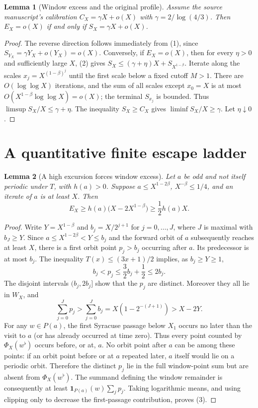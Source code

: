 \documentclass[11pt]{amsart}
\newtheorem{lemma}{Lemma}
\theoremstyle{remark}
\begin{document}
\begin{lemma}[Window excess and the original profile]\label{lem:equivalence}
Assume the source manuscript's calibration
$C_X=\gamma X+o(X)$ with $\gamma=2/\log(4/3)$.
Then $E_X=o(X)$ if and only if $S_X=\gamma X+o(X)$.
\end{lemma}
\begin{proof}
The reverse direction follows immediately from (1), since
$S_{Y_X}=\gamma Y_X+o(Y_X)=o(X)$.
Conversely, if $E_X=o(X)$, then for every $\eta>0$ and sufficiently
large $X$, (2) gives
$S_X\le(\gamma+\eta)X+S_{X^{1-\beta}}$.
Iterate along the scales $x_j=X^{(1-\beta)^j}$ until the first scale
below a fixed cutoff $M>1$. There are $O(\log\log X)$ iterations,
and the sum of all scales except $x_0=X$ is at most
$O(X^{1-\beta}\log\log X)=o(X)$; the terminal $S_{x_j}$ is bounded.
Thus $\limsup S_X/X\le\gamma+\eta$.
The inequality $S_X\ge C_X$ gives $\liminf S_X/X\ge\gamma$.
Let $\eta\downarrow0$.
\end{proof}

\section{A quantitative finite escape ladder}
\begin{lemma}[A high excursion forces window excess]\label{lem:ladder}
Let $a$ be odd and not itself periodic under $T$, with $h(a)>0$.
Suppose $a\le X^{1-2\beta}$, $X^{-\beta}\le1/4$, and an iterate of
$a$ is at least $X$. Then
\[
E_X\ge h(a)\bigl(X-2X^{1-\beta}\bigr)
\ge\frac12h(a)X.\tag{3}
\]
\end{lemma}
\begin{proof}
Write $Y=X^{1-\beta}$ and $b_j=X/2^{j+1}$ for
$j=0,\dots,J$, where $J$ is maximal with $b_J\ge Y$.
Since $a\le X^{1-2\beta}<Y\le b_j$ and the forward orbit of $a$
subsequently reaches at least $X$, there is a first orbit point
$p_j>b_j$ occurring after $a$. Its predecessor is at most $b_j$.
The inequality $T(x)\le(3x+1)/2$ implies, as $b_j\ge Y\ge1$,
\[
b_j<p_j\le\frac32b_j+\frac12\le2b_j.
\]
The disjoint intervals $(b_j,2b_j]$ show that the $p_j$ are distinct.
Moreover they all lie in $W_X$, and
\[
\sum_{j=0}^J p_j>\sum_{j=0}^Jb_j
=X(1-2^{-(J+1)})>X-2Y.
\]
For any $w\in P(a)$, the first Syracuse passage below $X_1$ occurs
no later than the visit to $a$ (or has already occurred at time zero).
Thus every point counted by $\Phi_X(w^\flat)$ occurs before, or at, $a$.
No orbit point after $a$ can be among these points: if an orbit point
before or at $a$ repeated later, $a$ itself would lie on a periodic
orbit. Therefore the distinct $p_j$ lie in the full window-point sum
but are absent from $\Phi_X(w^\flat)$.
The summand defining the window remainder is consequently at least
$\mathbf1_{P(a)}(w)\sum_jp_j$. Taking logarithmic means, and using
clipping only to decrease the first-passage contribution, proves (3).
\end{proof}
\end{document}
